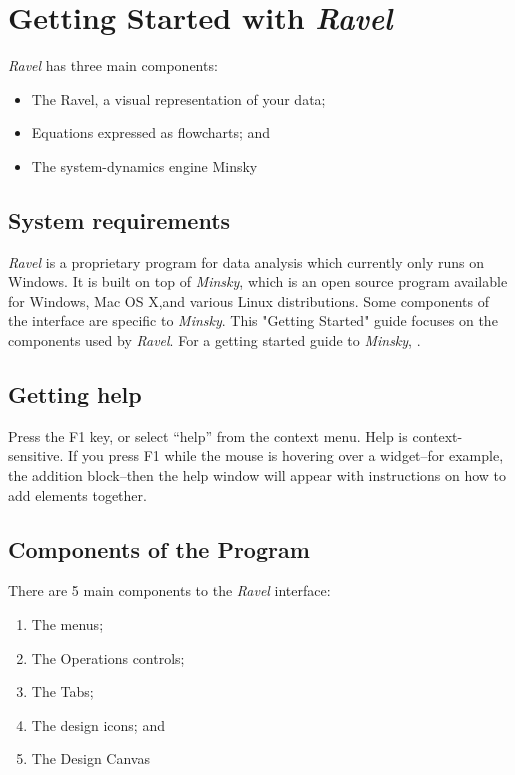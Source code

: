 
\chapter{Getting Started with \emph{Ravel}}

\emph{Ravel} has three main components: 
\begin{itemize}
\item The Ravel, a visual representation of your data; 
\item Equations expressed as flowcharts; and 
\item The system-dynamics engine Minsky 
\end{itemize}

\section{System requirements}

\emph{Ravel} is a proprietary program for data analysis which currently
only runs on Windows. It is built on top of \emph{Minsky}, which is
an open source program available for Windows, Mac OS X,and various
Linux distributions. Some components of the interface are specific
to \emph{Minsky}. This "Getting Started" guide focuses on the components
used by \emph{Ravel}. For a getting started guide to \emph{Minsky},
.

\section{Getting help}

Press the F1 key, or select ``help'' from the context menu. Help
is context-sensitive. If you press F1 while the mouse is hovering
over a widget--for example, the addition block--then the help window
will appear with instructions on how to add elements together.

\section{Components of the Program}

There are 5 main components to the \emph{Ravel} interface:
\begin{enumerate}
\item The menus;
\item The Operations controls;
\item The Tabs;
\item The design icons; and
\item The Design Canvas
\end{enumerate}

